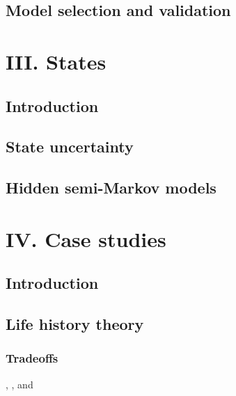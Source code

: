 \documentclass[
  12pt,
]{krantz}
\begin{document}
\hypertarget{model-selection}{%
\chapter{Model selection and validation}\label{model-selection}}

\hypertarget{part-iii.-states}{%
\part{III. States}\label{part-iii.-states}}

\hypertarget{introduction-4}{%
\chapter*{Introduction}\label{introduction-4}}


\hypertarget{uncertainty}{%
\chapter{State uncertainty}\label{uncertainty}}

\hypertarget{hsmm}{%
\chapter{Hidden semi-Markov models}\label{hsmm}}

\hypertarget{part-iv.-case-studies}{%
\part{IV. Case studies}\label{part-iv.-case-studies}}

\hypertarget{introduction-5}{%
\chapter*{Introduction}\label{introduction-5}}


\hypertarget{tradeoffs}{%
\chapter{Life history theory}\label{tradeoffs}}

\hypertarget{tradeoffs-1}{%
\section{Tradeoffs}\label{tradeoffs-1}}

\citet{morano_life-history_2013}, \citet{shefferson_life_2003}, and \citet{cruz-flores_sex-specific_nodate}
\end{document}
